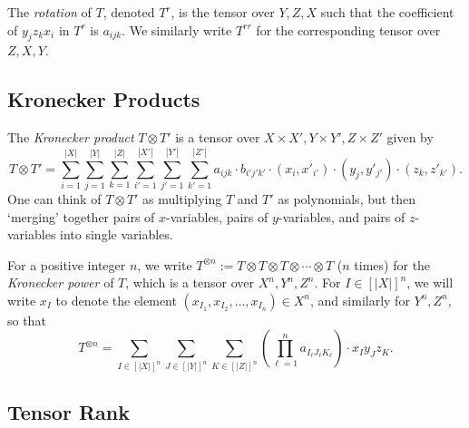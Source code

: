\PassOptionsToPackage{shortlabels}{enumitem}\documentclass[10pt,a4paper]{article}
\begin{document}
The \emph{rotation} of $T$, denoted $T^r$, is the tensor over $Y,Z,X$ such that the coefficient of $y_jz_kx_i$ in $T^r$ is $a_{ijk}$. We similarly write $T^{rr}$ for the corresponding tensor over $Z,X,Y$.

\subsection{Kronecker Products}

The \emph{Kronecker product} $T \otimes T'$ is a tensor over $X \times X', Y \times Y', Z \times Z'$ given by
$$T \otimes T' = \sum_{i=1}^{|X|} \sum_{j=1}^{|Y|} \sum_{k=1}^{|Z|} \sum_{i'=1}^{|X'|} \sum_{j'=1}^{|Y'|} \sum_{k'=1}^{|Z'|} a_{ijk} \cdot b_{i'j'k'} \cdot (x_i,x'_{i'}) \cdot (y_j,y'_{j'}) \cdot (z_k,z'_{k'}).$$ One can think of $T \otimes T'$ as multiplying $T$ and $T'$ as polynomials, but then `merging' together pairs of $x$-variables, pairs of $y$-variables, and pairs of $z$-variables into single variables.

For a positive integer $n$, we write $T^{\otimes n} := T \otimes T \otimes T \otimes \cdots \otimes T$ ($n$ times) for the \emph{Kronecker power} of $T$, which is a tensor over $X^n, Y^n, Z^n$. For $I \in [|X|]^n$, we will write $x_I$ to denote the element $(x_{I_1}, x_{I_2}, \ldots, x_{I_n}) \in X^n$, and similarly for $Y^n,Z^n$, so that
$$T^{\otimes n} = \sum_{I \in [|X|]^n} \sum_{J \in [|Y|]^n} \sum_{K \in [|Z|]^n} \left( \prod_{\ell=1}^n a_{I_\ell J_\ell K_\ell}  \right) \cdot x_I  y_J  z_K.$$

\subsection{Tensor Rank}
\end{document}
